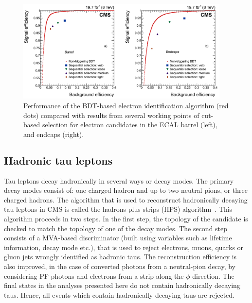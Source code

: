 \begin{figure}[!htpb]\centering
 \includegraphics[width=0.95\textwidth]{plots_and_figures/chapter4/elec_eff.png}
\caption{Performance of the BDT-based electron identification algorithm (red dots) compared with results from several working points of cut-based selection for electron candidates in the ECAL barrel (left), and endcaps (right).}
 \label{fig:elec_eff}
\end{figure}


\subsection{Hadronic tau leptons}
\label{tau_recon}
Tau leptons decay hadronically in several ways or decay modes. The primary decay modes consist of: one charged hadron and up to two neutral pions, or three charged hadrons. The algorithm that is used to reconstruct hadronically decaying tau leptons in CMS is called the hadrons-plus-strips (HPS) algorithm~\cite{Khachatryan:2015dfa,Sirunyan:tau16}. This algorithm proceeds in two steps. In the first step, the topology of the candidate is checked to match the topology of one of the decay modes. The second step consists of a MVA-based discriminator (built using variables such as lifetime information, decay mode etc.), that is used to reject electrons, muons, quarks or gluon jets wrongly identified as hadronic taus. The reconstruction efficiency is also improved, in the case of converted photons from a neutral-pion decay, by considering PF photons and electrons from a strip along the $\phi$ direction. The final states in the analyses presented here do not contain hadronically decaying taus. Hence, all events which contain hadronically decaying taus are rejected.


